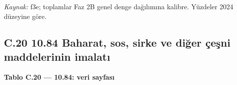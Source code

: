 \emph{Kaynak:} \etiketT{} f3e; toplamlar Faz 2B genel denge dağılımına kalibre. Yüzdeler 2024 düzeyine göre.

\hypertarget{nace_kartlar_10-12-c20-1084-baharat-sos-sirke-ve-diux11fer-uxe7eux15fni-maddelerinin-imalatux131}{%
\subsection{C.20 10.84 Baharat, sos, sirke ve diğer çeşni maddelerinin imalatı}\label{nace_kartlar_10-12-c20-1084-baharat-sos-sirke-ve-diux11fer-uxe7eux15fni-maddelerinin-imalatux131}}


\textbf{Tablo C.20 --- 10.84: veri sayfası}

\nopagebreak[4]

\begingroup\gbtablo\small

